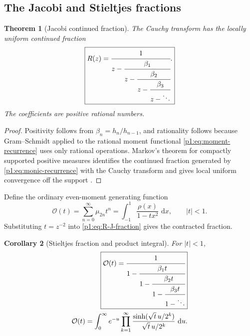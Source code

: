 \documentclass[11pt]{article}
\newtheorem{theorem}{Theorem}[section]
\newtheorem{corollary}[theorem]{Corollary}
\theoremstyle{definition}
\theoremstyle{remark}
\newcommand{\dd}{\,\mathrm d}
\newcommand{\cO}{\mathcal O}
\begin{document}
\subsection{The Jacobi and Stieltjes fractions}

\begin{theorem}[Jacobi continued fraction]\label{p1:thm:J-fraction}
The Cauchy transform has the locally uniform continued fraction
\begin{equation}
 \boxed{
 R(z)=\cfrac{1}{z-\cfrac{\beta_1}{z-\cfrac{\beta_2}{z-
           \cfrac{\beta_3}{z-\ddots}}}}.
 }                                                           \label{p1:eq:R-J-fraction}
\end{equation}
The coefficients are positive rational numbers.
\end{theorem}

\begin{proof}
Positivity follows from \(\beta_n=h_n/h_{n-1}\), and rationality follows because
Gram--Schmidt applied to the rational moment functional \eqref{p1:eq:moment-recurrence}
uses only rational operations.  Markov's theorem for compactly supported positive measures
identifies the continued fraction generated by \eqref{p1:eq:monic-recurrence} with the Cauchy
transform and gives local uniform convergence off the support \cite{p1:VanAssche1993,p1:SimonOPRL}.
\end{proof}

Define the ordinary even-moment generating function
\begin{equation}
 \cO(t)=\sum_{n=0}^{\infty}\mu_{2n}t^n
 =\int_{-1}^{1}\frac{\rho(x)}{1-tx^2}\,\dd x,
 \qquad |t|<1.                                               \label{p1:eq:O-def}
\end{equation}
Substituting \(t=z^{-2}\) into \eqref{p1:eq:R-J-fraction} gives the contracted fraction.

\begin{corollary}[Stieltjes fraction and product integral]\label{p1:cor:S-fraction}
For \(|t|<1\),
\begin{align}
 \boxed{
 \cO(t)=\cfrac{1}{1-\cfrac{\beta_1t}{1-\cfrac{\beta_2t}{1-
               \cfrac{\beta_3t}{1-\ddots}}}}
 }                                                           \label{p1:eq:O-S-fraction}\\
 \cO(t)=\int_0^{\infty}e^{-u}
 \prod_{k=1}^{\infty}
 \frac{\sinh(\sqrt t\,u/2^k)}{\sqrt t\,u/2^k}\,\dd u.    \label{p1:eq:O-product-integral}
\end{align}
\end{corollary}
\end{document}
